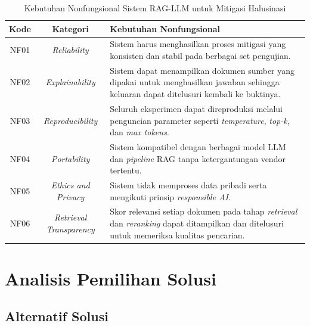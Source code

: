 \begin{table}[H]
\centering
\caption{Kebutuhan Nonfungsional Sistem RAG-LLM untuk Mitigasi Halusinasi}
\label{tbl:kebutuhan-nonfungsional}
\begin{tabular}{|c|c|p{8cm}|}
\hline
\textbf{Kode} & \textbf{Kategori} & \textbf{Kebutuhan Nonfungsional} \\ \hline

NF01 & \textit{Reliability} & Sistem harus menghasilkan proses mitigasi yang konsisten dan stabil pada berbagai set pengujian. \\ \hline

NF02 & \textit{Explainability} & Sistem dapat menampilkan dokumen sumber yang dipakai untuk menghasilkan jawaban sehingga keluaran dapat ditelusuri kembali ke buktinya. \\ \hline

NF03 & \textit{Reproducibility} & Seluruh eksperimen dapat direproduksi melalui penguncian parameter seperti \textit{temperature}, \textit{top-k}, dan \textit{max tokens}. \\ \hline

NF04 & \textit{Portability} & Sistem kompatibel dengan berbagai model LLM dan \textit{pipeline} RAG tanpa ketergantungan vendor tertentu. \\ \hline

NF05 & \textit{Ethics and Privacy} & Sistem tidak memproses data pribadi serta mengikuti prinsip \textit{responsible AI}. \\ \hline

NF06 & \textit{Retrieval Transparency} & Skor relevansi setiap dokumen pada tahap \textit{retrieval} dan \textit{reranking} dapat ditampilkan dan ditelusuri untuk memeriksa kualitas pencarian. \\ \hline

\end{tabular}
\end{table}




\section{Analisis Pemilihan Solusi}
\label{sec:analisis-pemilihan-solusi}

\subsection{Alternatif Solusi}

